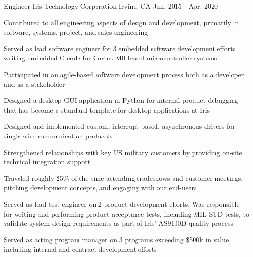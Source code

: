 \begin{cventries}
  \cventry
    {Engineer} %
    {Iris Technology Corporation} %
    {Irvine, CA} %
    {Jun. 2015 - Apr. 2020} %
    {
      \begin{cvitems} %
        \item {Contributed to all engineering aspects of design and development, primarily in software, systems, project, and sales engineering}
        \item {Served as lead software engineer for 3 embedded software development efforts writing embedded C code for Cortex-M0 based microcontroller systems}
        \item {Participated in an agile-based software development process both as a developer and as a stakeholder}
        \item {Designed a desktop GUI application in Python for internal product debugging that has become a standard template for desktop applications at Iris}
        \item {Designed and implemented custom, interrupt-based, asynchronous drivers for single wire communication protocols}
        \item {Strengthened relationships with key US military customers by providing on-site technical integration support}
        \item {Traveled roughly 25\% of the time attending tradeshows and customer meetings, pitching development concepts, and engaging with our end-users}
        \item {Served as lead test engineer on 2 product development efforts. Was responsible for writing and performing product acceptance tests, including MIL-STD tests, to validate system design requirements as part of Iris' AS9100D quality process}
        \item {Served as acting program manager on 3 programs exceeding \$500k in value, including internal and contract development efforts}
      \end{cvitems}
    }

\end{cventries}
